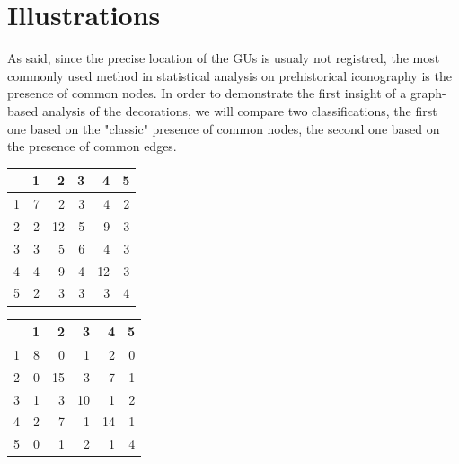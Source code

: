 \documentclass[article]{jss}\usepackage{knitr}
\begin{document}
\section{Illustrations} \label{sec:illustrations}

As said, since the precise location of the GUs is usualy not registred, the most commonly used method in statistical analysis on prehistorical iconography is the presence of common nodes. In order to demonstrate the first insight of a graph-based analysis of the decorations, we will compare two classifications, the first one based on the "classic" presence of common nodes, the second one based on the presence of common edges.

\begin{table}[H]
\begin{minipage}{.45\textwidth}
\centering
\begin{table}[H]
\centering
\begin{tabular}{rrrrrr}
  \hline
 & 1 & 2 & 3 & 4 & 5 \\ 
  \hline
1 & 7 & 2 & 3 & 4 & 2 \\ 
  2 & 2 & 12 & 5 & 9 & 3 \\ 
  3 & 3 & 5 & 6 & 4 & 3 \\ 
  4 & 4 & 9 & 4 & 12 & 3 \\ 
  5 & 2 & 3 & 3 & 3 & 4 \\ 
   \hline
\end{tabular}
\end{table}

\end{minipage}
\begin{minipage}{.45\textwidth}
\centering
\begin{table}[H]
\centering
\begin{tabular}{rrrrrr}
  \hline
 & 1 & 2 & 3 & 4 & 5 \\ 
  \hline
1 & 8 & 0 & 1 & 2 & 0 \\ 
  2 & 0 & 15 & 3 & 7 & 1 \\ 
  3 & 1 & 3 & 10 & 1 & 2 \\ 
  4 & 2 & 7 & 1 & 14 & 1 \\ 
  5 & 0 & 1 & 2 & 1 & 4 \\ 
   \hline
\end{tabular}
\end{table}

\end{minipage}
\end{table}
\end{document}
